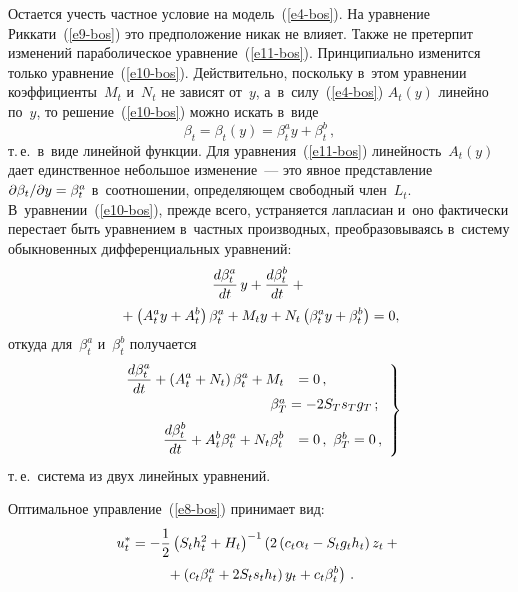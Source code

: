 \begin{multicols}{2}
     Остается учесть частное условие на модель~(\ref{e4-bos}). На 
уравнение Риккати~(\ref{e9-bos}) это предположение никак не влияет. Также 
не претерпит изменений параболическое уравнение~(\ref{e11-bos}).  
Принципиально изменится только уравнение~(\ref{e10-bos}). Действительно, 
поскольку в~этом уравнении коэффициенты~$M_t$ и~$N_t$ не зависят 
от~$y$, а~в~силу~(\ref{e4-bos}) $A_t(y)$ линейно по~$y$, то 
решение~(\ref{e10-bos}) можно искать в~виде 
$$
\beta_t= \beta_t(y)= 
\beta_t^a y + \beta_t^b\,,
$$
 т.\,е.\ в~виде линейной функции. Для 
уравнения~(\ref{e11-bos}) линейность~$A_t(y)$ дает единственное 
небольшое изменение~--- это явное представление $\partial\beta_t/\partial 
y\hm= \beta_t^a$ в~соотношении, определяющем свободный член~$L_t$. 
В~уравнении~(\ref{e10-bos}), прежде всего, устраняется лапласиан и~оно 
фактически перестает быть уравнением в~частных производных, 
преобразовываясь в~систему обыкновенных дифференциальных уравнений:
   \begin{multline*}
     \displaystyle\frac{\displaystyle d\beta_t^a\mathstrut}{\displaystyle dt\mathstrut}\,y+\displaystyle\frac{\displaystyle d\beta_t^b\mathstrut}{\displaystyle dt\mathstrut}+{}\\
     {}+\left( A_t^a 
y+A_t^b\right)\beta_t^a +M_t y+ N_t\left( \beta_t^a y+\beta_t^b\right) =0,
     \end{multline*}
откуда для~$\beta_t^a$ и~$\beta_t^b$ получается
\begin{equation}
\left.
\begin{array}{rl}
\fr{d\beta_t^a}{dt}+\left( A_t^a+N_t\right) \beta_t^a +M_t&=0\,,\\
&\hspace*{-7mm} \beta_T^a=-2S_T s_T g_T\,;\\[6pt]
\fr{d\beta_t^b}{dt}+A_t^b \beta_t^a +N_t \beta_t^b &=0\,, \ \beta_T^b=0\,,
\end{array}
\right\}
\label{e12-bos}
\end{equation}
т.\,е.\ система из двух линейных уравнений.

     Оптимальное управление~(\ref{e8-bos}) принимает вид:
     \begin{multline}
     u_t^*=-\displaystyle\frac{\displaystyle 1\mathstrut}{\displaystyle 2\mathstrut}\left( S_t h_t^2+H_t\right)^{-1} \left( 2 \left( c_t\alpha_t - 
S_t g_t h_t\right) z_t +{}\right.\\
\left.{}+\left( c_t\beta_t^a +2S_t s_t h_t\right) y_t +c_t 
\beta_t^b\right)\,.
     \label{e13-bos}
     \end{multline}
     

\end{multicols}
